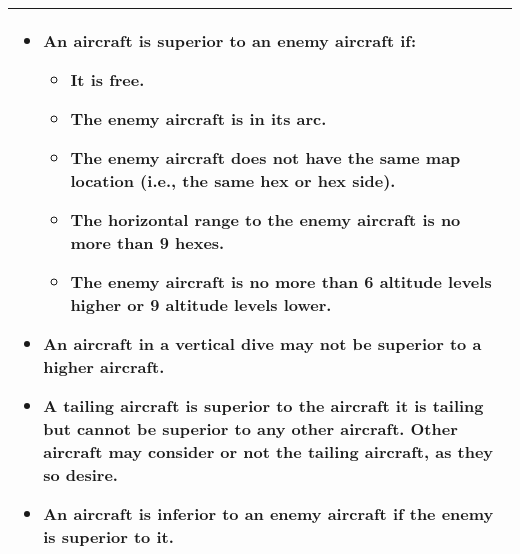 {\begin{twocolumntablefloat}[t]
\begin{multicols}{2}
\begin{onecolumntable}
\begin{tabularx}{\linewidth}{L}
\toprule
\begin{itemize}[topsep=0pt]
\item An aircraft is superior to an enemy aircraft if:
\begin{itemize}
    \item It is free.
    \item The enemy aircraft is in its  arc.
    \item The enemy aircraft does not have the same map location (i.e., the same hex or hex side).
    \item The horizontal range to the enemy aircraft is no more than 9 hexes.
    \item The enemy aircraft is no more than 6 altitude levels higher or 9 altitude levels lower.
\end{itemize}

\item An aircraft in a vertical dive may not be superior to a higher aircraft.

\item A tailing aircraft is superior to the aircraft it is tailing but cannot be superior to any other aircraft. Other aircraft may consider or not the tailing aircraft, as they so desire.

\item An aircraft is inferior to an enemy aircraft if the enemy is superior to it.
\end{itemize}\\
\bottomrule
\end{tabularx}
\end{onecolumntable}

\end{multicols}

\end{twocolumntablefloat}

}


